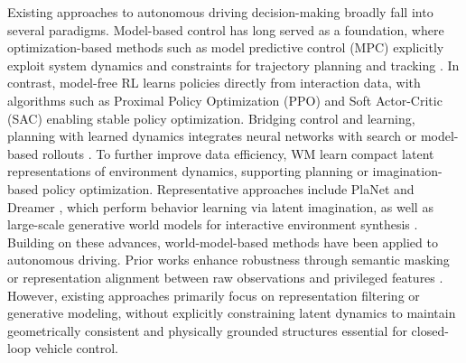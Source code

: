 


Existing approaches to autonomous driving decision-making broadly fall into several paradigms. Model-based control has long served as a foundation, where optimization-based methods such as model predictive control (MPC) explicitly exploit system dynamics and constraints for trajectory planning and tracking \cite{falcone2007predictive}. In contrast, model-free RL learns policies directly from interaction data, with algorithms such as Proximal Policy Optimization (PPO) \cite{schulman2017proximal} and Soft Actor-Critic (SAC) \cite{haarnoja2018soft} enabling stable policy optimization.
Bridging control and learning, planning with learned dynamics integrates neural networks with search or model-based rollouts \cite{silver2016mastering,ha2018recurrent}. To further improve data efficiency, WM learn compact latent representations of environment dynamics, supporting planning or imagination-based policy optimization. Representative approaches include PlaNet and Dreamer \cite{hafner2019learning,hafner2019dream,hafner2025mastering}, which perform behavior learning via latent imagination, as well as large-scale generative world models for interactive environment synthesis \cite{bruce2024genie}.
Building on these advances, world-model-based methods have been applied to autonomous driving. Prior works enhance robustness through semantic masking or representation alignment between raw observations and privileged features \cite{gao2024enhance,yang2025raw2drive}. However, existing approaches primarily focus on representation filtering or generative modeling, without explicitly constraining latent dynamics to maintain geometrically consistent and physically grounded structures essential for closed-loop vehicle control.

